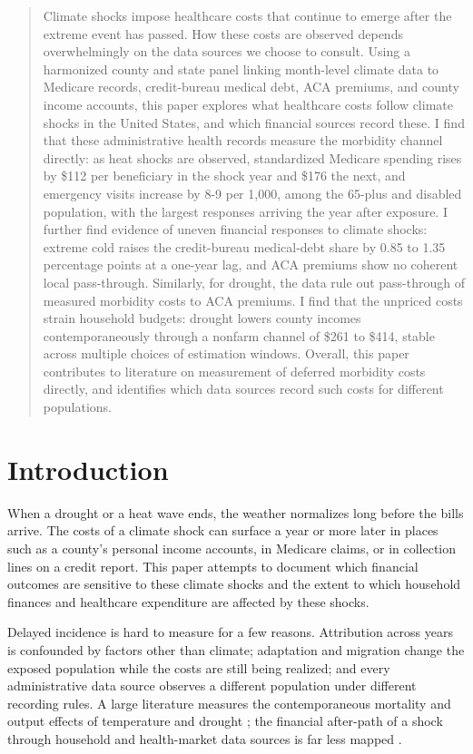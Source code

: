 \documentclass[a4paper,11pt]{report}
\begin{document}
\begingroup\small\begin{quote}
Climate shocks impose healthcare costs that continue to emerge after the extreme event has passed. How these costs are observed depends overwhelmingly on the data sources we choose to consult. Using a harmonized county and state panel linking month-level climate data to Medicare records, credit-bureau medical debt, ACA premiums, and county income accounts, this paper explores what healthcare costs follow climate shocks in the United States, and which financial sources record these.  I find that these administrative health records measure the morbidity channel directly: as heat shocks are observed, standardized Medicare spending rises by \$112 per beneficiary in the shock year and \$176 the next, and emergency visits increase by 8-9 per 1,000, among the 65-plus and disabled population, with the largest responses arriving the year after exposure. I further find evidence of uneven financial responses to climate shocks: extreme cold raises the credit-bureau medical-debt share by 0.85 to 1.35 percentage points at a one-year lag, and ACA premiums show no coherent local pass-through. Similarly, for drought, the data rule out pass-through of measured morbidity costs to ACA premiums. I find that the unpriced costs strain household budgets: drought lowers county incomes contemporaneously through a nonfarm channel of \$261 to \$414, stable across multiple choices of estimation windows. Overall, this paper contributes to literature on measurement of deferred morbidity costs directly, and identifies which data sources record such costs for different populations.
\end{quote}\endgroup

\FloatBarrier
\section{Introduction}

When a drought or a heat wave ends, the weather normalizes long before the bills arrive. The costs of a climate shock can surface a year or more later in places such as a county's personal income accounts, in Medicare claims, or in collection lines on a credit report. This paper attempts to document which financial outcomes are sensitive to these climate shocks and the extent to which household finances and healthcare expenditure are affected by these shocks.

Delayed incidence is hard to measure for a few reasons. Attribution across years is confounded by factors other than climate; adaptation and migration change the exposed population while the costs are still being realized; and every administrative data source observes a different population under different recording rules. A large literature measures the contemporaneous mortality and output effects of temperature and drought \citep{deschenes2007agricultural,dell2014weather,hsiang2016econometrics}; the financial after-path of a shock through household and health-market data sources is far less mapped \citep{dobkin2018hospital,kluender2021debt}.
\end{document}
